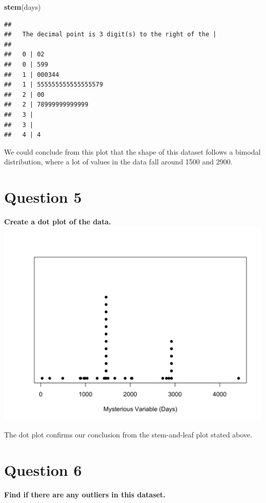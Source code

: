 \documentclass[
]{book}
\newenvironment{Shaded}{\begin{snugshade}}{\end{snugshade}}
\newcommand{\FunctionTok}[1]{\textcolor[rgb]{0.13,0.29,0.53}{\textbf{#1}}}
\newcommand{\NormalTok}[1]{#1}
\begin{document}
\begin{Shaded}
\begin{Highlighting}[]
\FunctionTok{stem}\NormalTok{(days)}
\end{Highlighting}
\end{Shaded}

\begin{verbatim}
## 
##   The decimal point is 3 digit(s) to the right of the |
## 
##   0 | 02
##   0 | 599
##   1 | 000344
##   1 | 555555555555555579
##   2 | 00
##   2 | 78999999999999
##   3 | 
##   3 | 
##   4 | 4
\end{verbatim}

We could conclude from this plot that the shape of this dataset follows a bimodal distribution, where a lot of values in the data fall around 1500 and 2900.

\section{Question 5}\label{question-5}

\textbf{Create a dot plot of the data.}
\includegraphics{unnamed-chunk-5-1.png}

The dot plot confirms our conclusion from the stem-and-leaf plot stated above.

\section{Question 6}\label{question-6}

\textbf{Find if there are any outliers in this dataset.}
\end{document}
